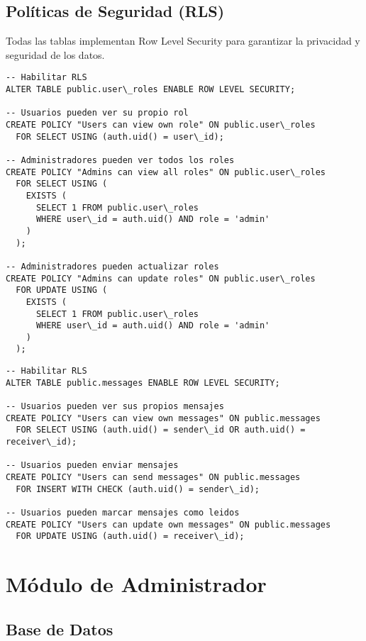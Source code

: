 \documentclass[12pt,a4paper]{article}
\begin{document}
\subsection{Políticas de Seguridad (RLS)}

Todas las tablas implementan Row Level Security para garantizar la privacidad y seguridad de los datos.

\begin{lstlisting}[caption=Políticas RLS para user\_roles]
-- Habilitar RLS
ALTER TABLE public.user\_roles ENABLE ROW LEVEL SECURITY;

-- Usuarios pueden ver su propio rol
CREATE POLICY "Users can view own role" ON public.user\_roles
  FOR SELECT USING (auth.uid() = user\_id);

-- Administradores pueden ver todos los roles
CREATE POLICY "Admins can view all roles" ON public.user\_roles
  FOR SELECT USING (
    EXISTS (
      SELECT 1 FROM public.user\_roles 
      WHERE user\_id = auth.uid() AND role = 'admin'
    )
  );

-- Administradores pueden actualizar roles
CREATE POLICY "Admins can update roles" ON public.user\_roles
  FOR UPDATE USING (
    EXISTS (
      SELECT 1 FROM public.user\_roles 
      WHERE user\_id = auth.uid() AND role = 'admin'
    )
  );
\end{lstlisting}

\begin{lstlisting}[caption=Políticas RLS para messages]
-- Habilitar RLS
ALTER TABLE public.messages ENABLE ROW LEVEL SECURITY;

-- Usuarios pueden ver sus propios mensajes
CREATE POLICY "Users can view own messages" ON public.messages
  FOR SELECT USING (auth.uid() = sender\_id OR auth.uid() = receiver\_id);

-- Usuarios pueden enviar mensajes
CREATE POLICY "Users can send messages" ON public.messages
  FOR INSERT WITH CHECK (auth.uid() = sender\_id);

-- Usuarios pueden marcar mensajes como leidos
CREATE POLICY "Users can update own messages" ON public.messages
  FOR UPDATE USING (auth.uid() = receiver\_id);
\end{lstlisting}

\section{Módulo de Administrador}

\subsection{Base de Datos}
	
\end{document}
